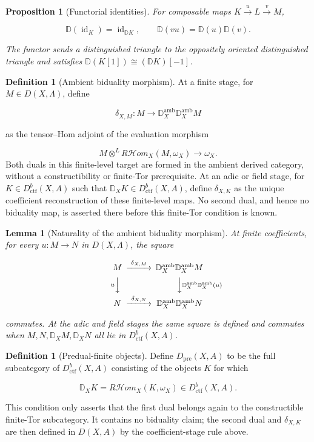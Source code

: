 \documentclass[10pt]{article}
\newtheorem{proposition}[theorem]{Proposition}
\newtheorem{lemma}[theorem]{Lemma}
\theoremstyle{definition}
\newtheorem{definition}[theorem]{Definition}
\newcommand{\Dctf}{D^b_{\mathrm{ctf}}}
\newcommand{\RHom}{R\mathcal Hom}
\newcommand{\DD}{\mathbb D}
\begin{document}
\begin{proposition}[Functorial identities]
For composable maps \(K\xrightarrow uL\xrightarrow vM\),

\[
 \DD(\operatorname{id}_K)=\operatorname{id}_{\DD K},
 \qquad
 \DD(vu)=\DD(u)\DD(v).
\]

The functor sends a distinguished triangle to the oppositely oriented
distinguished triangle and satisfies
\(\DD(K[1])\cong(\DD K)[-1]\).
\end{proposition}

\begin{definition}[Ambient biduality morphism]
At a finite stage, for \(M\in D(X,\Lambda)\), define

\[
 \delta_{X,M}:M\longrightarrow
 \DD_X^{\mathrm{amb}}\DD_X^{\mathrm{amb}}M
\]

as the tensor--Hom adjoint of the evaluation morphism

\[
 M\otimes^L\RHom_X(M,\omega_X)\longrightarrow\omega_X.
\]
Both duals in this finite-level target are formed in the ambient derived
category, without a constructibility or finite-Tor prerequisite.  At an adic
or field stage, for \(K\in\Dctf(X,A)\) such that
\(\DD_XK\in\Dctf(X,A)\), define \(\delta_{X,K}\) as the unique coefficient
reconstruction of these finite-level maps.  No second dual, and hence no
biduality map, is asserted there before this finite-Tor condition is known.
\end{definition}

\begin{lemma}[Naturality of the ambient biduality morphism]
At finite coefficients, for every \(u:M\to N\) in \(D(X,\Lambda)\), the
square

\[
\begin{CD}
M @>{\delta_{X,M}}>> \DD_X^{\mathrm{amb}}\DD_X^{\mathrm{amb}}M\\
@V{u}VV @VV{\DD_X^{\mathrm{amb}}\DD_X^{\mathrm{amb}}(u)}V\\
N @>{\delta_{X,N}}>> \DD_X^{\mathrm{amb}}\DD_X^{\mathrm{amb}}N
\end{CD}
\]

commutes.  At the adic and field stages the same square is defined and
commutes when \(M,N,\DD_XM,\DD_XN\) all lie in \(\Dctf(X,A)\).
\end{lemma}

\begin{definition}[Predual-finite objects]
Define \(D_{\mathrm{pre}}(X,A)\) to be the full subcategory of
\(\Dctf(X,A)\) consisting of the objects \(K\) for which

\[
 \DD_XK=\RHom_X(K,\omega_X)\in\Dctf(X,A).
\]

This condition only asserts that the first dual belongs again to the
constructible finite-Tor subcategory.  It contains no biduality claim; the
second dual and \(\delta_{X,K}\) are then defined in \(D(X,A)\) by the
coefficient-stage rule above.
\end{definition}
\end{document}

